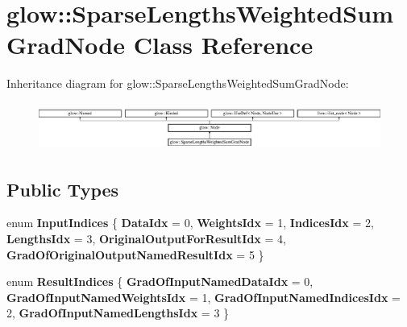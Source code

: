 \hypertarget{classglow_1_1_sparse_lengths_weighted_sum_grad_node}{}\section{glow\+:\+:Sparse\+Lengths\+Weighted\+Sum\+Grad\+Node Class Reference}
\label{classglow_1_1_sparse_lengths_weighted_sum_grad_node}
Inheritance diagram for glow\+:\+:Sparse\+Lengths\+Weighted\+Sum\+Grad\+Node\+:\begin{figure}[H]
\begin{center}
\leavevmode
\includegraphics[height=1.555556cm]{classglow_1_1_sparse_lengths_weighted_sum_grad_node}
\end{center}
\end{figure}
\subsection*{Public Types}
\begin{DoxyCompactItemize}
\item 
\mbox{\label{classglow_1_1_sparse_lengths_weighted_sum_grad_node_aed68717dcbb2c530d007ba81678c43f1}} 
enum {\bfseries Input\+Indices} \{ \newline
{\bfseries Data\+Idx} = 0, 
{\bfseries Weights\+Idx} = 1, 
{\bfseries Indices\+Idx} = 2, 
{\bfseries Lengths\+Idx} = 3, 
\newline
{\bfseries Original\+Output\+For\+Result\+Idx} = 4, 
{\bfseries Grad\+Of\+Original\+Output\+Named\+Result\+Idx} = 5
 \}
\item 
\mbox{\label{classglow_1_1_sparse_lengths_weighted_sum_grad_node_a208f57d756bda9ac0c8f53a1500bc5e2}} 
enum {\bfseries Result\+Indices} \{ {\bfseries Grad\+Of\+Input\+Named\+Data\+Idx} = 0, 
{\bfseries Grad\+Of\+Input\+Named\+Weights\+Idx} = 1, 
{\bfseries Grad\+Of\+Input\+Named\+Indices\+Idx} = 2, 
{\bfseries Grad\+Of\+Input\+Named\+Lengths\+Idx} = 3
 \}
\end{DoxyCompactItemize}
